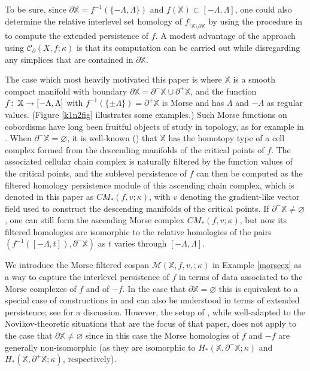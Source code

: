\documentclass[11pt]{amsart}
\theoremstyle{definition}
\theoremstyle{remark}
\numberwithin{equation}{section}
\def\co{\colon\thinspace}
\begin{document}
To be sure, since $\partial\mathbb{X}=f^{-1}(\{-\Lambda,\Lambda\})$ and $f(\mathbb{X})\subset [-\Lambda,\Lambda]$, one could also determine the relative interlevel set homology of  $f|_{\mathbb{X}\setminus\partial\mathbb{X}}$ by using the procedure in \cite{CEH09} to compute the extended persistence of $f$.  A modest advantage of the approach using $\mathcal{C}_{\partial}(X,f;\kappa)$ is that its computation can be carried out while disregarding any simplices that are contained in $\partial \mathbb{X}$.

The case which most heavily motivated this paper is where $\mathbb{X}$ is a smooth compact manifold with boundary $\partial\mathbb{X}=\partial^-\mathbb{X}\cup\partial^+\mathbb{X}$, and the function $f\co \mathbb{X}\to [-\Lambda,\Lambda]$ with $f^{-1}(\{\pm\Lambda\})=\partial^{\pm}\mathbb{X}$ is Morse and has $\Lambda$ and $-\Lambda$ as regular values. (Figure \ref{k1n2fig} illustrates some examples.)  Such Morse functions on cobordisms have long been fruitful objects of study in topology, as for example in \cite{Milhcob}. When $\partial^-\mathbb{X}=\varnothing$, it is well-known (\cite[Theorem 3.5]{Mil}) that $\mathbb{X}$ has the homotopy type of a cell complex formed from the descending manifolds of the critical points of $f$. The associated cellular chain complex is naturally filtered by the function values of the critical points, and the sublevel persistence of $f$ can then be computed as the filtered homology persistence module of this ascending chain complex, which is denoted in this paper as $CM_*(f,v;\kappa)$, with $v$ denoting the gradient-like vector field used to construct the descending manifolds of the critical points. If $\partial^-\mathbb{X}\neq\varnothing$, one can still form the ascending Morse complex $CM_*(f,v;\kappa)$, but now its filtered homologies are isomorphic to the relative homologies of the pairs $(f^{-1}([-\Lambda,t]),\partial^-\mathbb{X})$ as $t$ varies through $[-\Lambda,\Lambda]$.  

We introduce the Morse filtered cospan $\mathcal{M}(\mathbb{X},f,v,;\kappa)$ in Example \ref{morseex} as a way to capture the interlevel persistence of $f$ in terms of data associated to the Morse complexes of $f$ and of $-f$.  In the case that $\partial\mathbb{X}=\varnothing$ this is equivalent to a special case of constructions in \cite{U23} and can also be understood in terms of extended persistence; see \cite[Section 3.1]{U23} for a discussion.  However, the setup of \cite{U23}, while well-adapted to the Novikov-theoretic situations that are the focus of that paper, does not apply to the case that $\partial\mathbb{X}\neq \varnothing$ since in this case the Morse homologies of $f$ and $-f$ are generally non-isomorphic (as they are isomorphic to $H_*(\mathbb{X},\partial^-\mathbb{X};\kappa)$ and $H_*(\mathbb{X},\partial^+\mathbb{X};\kappa)$, respectively).
\end{document}

